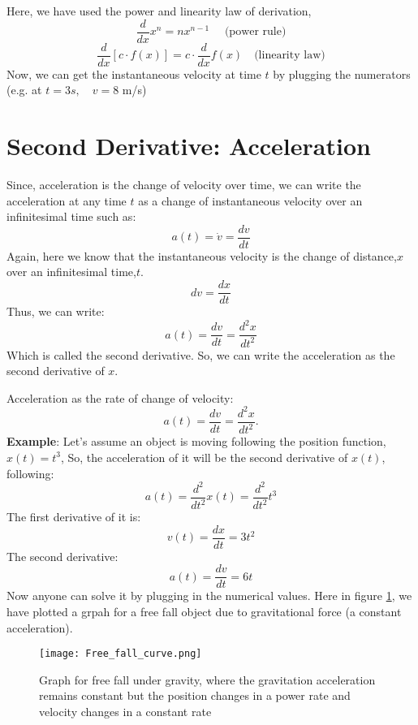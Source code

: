 \documentclass[12pt,a4paper]{article}
\begin{document}
    Here, we have used the power and linearity law of derivation,
    \[ \frac{d}{dx} x^n=nx^{n-1}\quad \text{ (power rule)}\]
    \[ \frac{d}{dx}[c\cdot f(x)]= c\cdot \frac{d}{dx}f(x) \quad   \text{(linearity law)}\]
Now, we can get the instantaneous velocity at time $t$ by plugging the numerators (e.g. at $t=3s, \quad v=8$ m/s)

 

\newpage

\section*{Second Derivative: Acceleration}

Since, acceleration is the change of velocity over time, we can write the acceleration at any time $t$ as a change of instantaneous velocity over an infinitesimal time such as:
\[
a(t) = \dot{v} = \frac{dv}{dt}
\]
Again, here we know that the instantaneous velocity is the change of distance,$x$ over an infinitesimal time,$t$. 
\[ dv=\frac{dx}{dt}\]
Thus, we can write:
\[
a(t) = \frac{dv}{dt} =\frac{d^2x}{dt^2}
\]
Which is called the second derivative. So, we can write the acceleration as the second derivative of $x$.

Acceleration as the rate of change of velocity:
\[
a(t) = \frac{dv}{dt} = \frac{d^2 x}{dt^2}.
\]
\textbf{Example}:
Let's assume an object is moving following the position function,$x(t)=t^3$,
So, the acceleration of it will be the second derivative of $x(t)$, following:
\[a(t) =\frac{d^2}{dt^2}x(t) = \frac{d^2}{dt^2}t^3\]
The first derivative of it is:
\[v(t) = \frac{dx}{dt}=3t^2\]
The second derivative:
\[a(t)=\frac{dv}{dt}=6t\]
Now anyone can solve it by plugging in the numerical values.
Here in figure \ref{fig:2}, we have plotted a grpah for a free fall object due to gravitational force (a constant acceleration).
\begin{figure}
    \centering
    \texttt{[image: Free\_fall\_curve.png]}
    \caption{Graph for free fall under gravity, where the gravitation acceleration remains constant but the position changes in a power rate and velocity changes in a constant rate}
    \label{fig:2}
\end{figure}
\newpage

\end{document}
